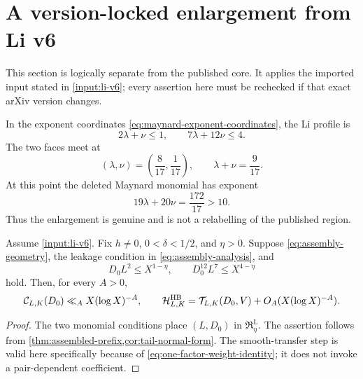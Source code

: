 \section{A version-locked enlargement from Li v6}
\label{sec:li-extension}

This section is logically separate from the published core.  It applies
the imported input stated in \cref{input:li-v6}; every assertion here
must be rechecked if that exact arXiv version changes.

In the exponent coordinates \eqref{eq:maynard-exponent-coordinates},
the Li profile is
\begin{equation}
 2\lambda+\nu\le1,
 \qquad
 7\lambda+12\nu\le4.
 \label{eq:li-exponent-polytope}
\end{equation}
The two faces meet at
\begin{equation}
 (\lambda,\nu)=\left(\frac8{17},\frac1{17}\right),
 \qquad \lambda+\nu=\frac9{17}.
 \label{eq:li-exponent-vertex}
\end{equation}
At this point the deleted Maynard monomial has exponent
\begin{equation}
 19\lambda+20\nu=\frac{172}{17}>10.
 \label{eq:li-vertex-outside-maynard}
\end{equation}
Thus the enlargement is genuine and is not a relabelling of the
published region.

\begin{theorem}
\label{thm:li-assembled-wedge}
Assume \cref{input:li-v6}.  Fix $h\ne0$, $0<\delta<1/2$, and $\eta>0$.
Suppose \eqref{eq:assembly-geometry}, the leakage condition in
\eqref{eq:assembly-analysis}, and
\begin{equation}
 D_0L^2\le X^{1-\eta},
 \qquad
 D_0^{12}L^7\le X^{4-\eta}
 \label{eq:li-assembly-conditions}
\end{equation}
hold.  Then, for every $A>0$,
\begin{equation}
 \mathcal C_{L,K}(D_0)\ll_A X(\log X)^{-A},
 \qquad
 \mathcal H^{\mathrm{HB}}_{L,K}
 =\mathcal T_{L,K}(D_0,V)+O_A(X(\log X)^{-A}).
 \label{eq:li-assembled-conclusion}
\end{equation}
\end{theorem}

\begin{proof}
The two monomial conditions place $(L,D_0)$ in
$\mathfrak R^{\mathrm L}_\eta$.  The assertion follows from
\cref{thm:assembled-prefix,cor:tail-normal-form}.  The smooth-transfer
step is valid here specifically because of
\eqref{eq:one-factor-weight-identity}; it does not invoke a
pair-dependent coefficient.
\end{proof}

